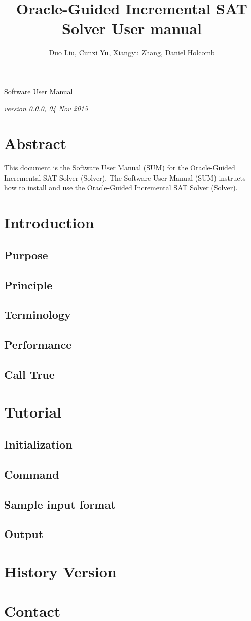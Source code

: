 \documentclass{article}
\title{\Huge{Oracle-Guided Incremental SAT Solver User manual}}
\author{\small{Duo Liu, Cunxi Yu, Xiangyu Zhang, Daniel Holcomb}}
\date{}
\begin{document}
\maketitle
\centerline{\Large{Software User Manual}}
\vspace{10pt}
\centerline{\small{\emph{version 0.0.0, 04 Nov 2015}}}


\newpage
\section*{Abstract} 
	This document is the Software User Manual (SUM) for the Oracle-Guided Incremental SAT Solver (Solver). The Software User Manual (SUM) instructs how to install and use the Oracle-Guided Incremental SAT Solver (Solver). 
	
	
\newpage
\tableofcontents

\section{Introduction}
	\subsection{Purpose}
	\subsection{Principle}
	\subsection{Terminology}
	\subsection{Performance}
	\subsection{Call True}
\section{Tutorial}
	\subsection{Initialization}
	\subsection{Command}
	\subsection{Sample input format}
	\subsection{Output}
\section{History Version}
\section{Contact}	
\end{document}
